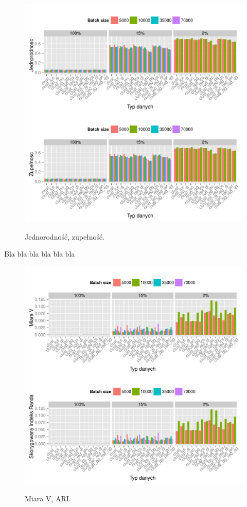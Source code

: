 \documentclass{praca1}
\begin{document}
\begin{figure}[!h]
  \centering
  \includegraphics[width=400pt]{plot15.pdf}\\
  \caption{Jednorodność, zupełność.}\label{plot:005}
\end{figure}


Bla bla bla bla bla bla

\begin{figure}[!h]
  \centering
  \includegraphics[width=400pt]{plot17.pdf}\\
  \caption{Miara V, ARI.}\label{plot:007}
\end{figure}
\end{document}
